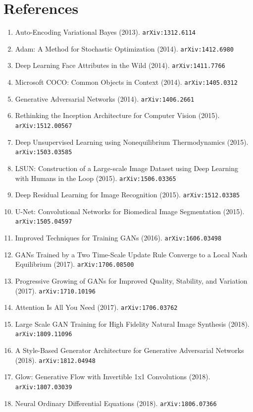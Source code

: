 \documentclass[11pt]{article}
\begin{document}
\section*{References}
\begin{enumerate}\small
  \item Auto-Encoding Variational Bayes (2013). \texttt{arXiv:1312.6114}
  \item Adam: A Method for Stochastic Optimization (2014). \texttt{arXiv:1412.6980}
  \item Deep Learning Face Attributes in the Wild (2014). \texttt{arXiv:1411.7766}
  \item Microsoft COCO: Common Objects in Context (2014). \texttt{arXiv:1405.0312}
  \item Generative Adversarial Networks (2014). \texttt{arXiv:1406.2661}
  \item Rethinking the Inception Architecture for Computer Vision (2015). \texttt{arXiv:1512.00567}
  \item Deep Unsupervised Learning using Nonequilibrium Thermodynamics (2015). \texttt{arXiv:1503.03585}
  \item LSUN: Construction of a Large-scale Image Dataset using Deep Learning
  with Humans in the Loop (2015). \texttt{arXiv:1506.03365}
  \item Deep Residual Learning for Image Recognition (2015). \texttt{arXiv:1512.03385}
  \item U-Net: Convolutional Networks for Biomedical Image Segmentation (2015). \texttt{arXiv:1505.04597}
  \item Improved Techniques for Training GANs (2016). \texttt{arXiv:1606.03498}
  \item GANs Trained by a Two Time-Scale Update Rule Converge to a Local Nash
  Equilibrium (2017). \texttt{arXiv:1706.08500}
  \item Progressive Growing of GANs for Improved Quality, Stability, and
  Variation (2017). \texttt{arXiv:1710.10196}
  \item Attention Is All You Need (2017). \texttt{arXiv:1706.03762}
  \item Large Scale GAN Training for High Fidelity Natural Image Synthesis (2018). \texttt{arXiv:1809.11096}
  \item A Style-Based Generator Architecture for Generative Adversarial Networks (2018). \texttt{arXiv:1812.04948}
  \item Glow: Generative Flow with Invertible 1x1 Convolutions (2018). \texttt{arXiv:1807.03039}
  \item Neural Ordinary Differential Equations (2018). \texttt{arXiv:1806.07366}

\end{enumerate}
\end{document}
